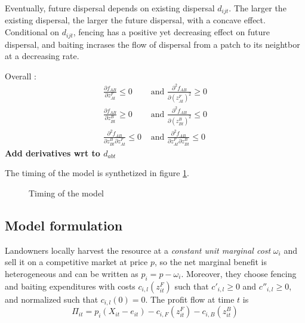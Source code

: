 \documentclass{article}
\begin{document}
Eventually, future dispersal depends on existing dispersal $d_{ijt}$. The larger the existing dispersal, the larger the future dispersal, with a concave effect. Conditional on $d_{ijt}$, fencing has a positive yet decreasing effect on future dispersal, and baiting incrases the flow of dispersal from a patch to its neightbor at a decreasing rate. 


 Overall : 
\begin{align*}
    \frac{\partial f_{AB}}{\partial z^F_{At}}\leq 0 &\text{ and } \frac{\partial^2 f_{AB}}{\partial (z^F_{At})^2} \geq 0\\
    \frac{\partial f_{AB}}{\partial z^B_{Bt}}\geq 0 &\text{ and } \frac{\partial^2 f_{AB}}{\partial (z^B_{Bt})^2} \leq 0\\
    \frac{\partial ^2 f_{AB}}{\partial z_{Bt}^B\partial z_{At}^F} \leq 0 &\text{ and } \frac{\partial ^2 f_{AB}}{\partial z_{At}^F\partial z_{Bt}^B} \leq 0
\end{align*}
\textbf{Add derivatives wrt to $d_{abt}$}


The timing of the model is synthetized in figure \ref{fig:timing}.

\begin{figure}[H]
  \centering
  \caption{Timing of the model}
  \label{fig:timing}
\end{figure}


\subsection{Model formulation}
Landowners locally harvest the resource at a \textit{constant unit marginal cost} $\omega_i$ and sell it on a competitive market at price $p$, so the net marginal benefit is heterogeneous and can be written as $p_i = p - \omega_i$. Moreover, they choose fencing and baiting expenditures with costs $c_{i,l}(z_{it}^F)$ such that $c'_{i,l}\geq 0$ and $c''_{i,l} \geq 0$, and normalized such that $c_{i,l}(0) = 0$. The profit flow at time $t$ is
\begin{equation}
    \Pi_{it} = p_i(X_{it} - e_{it}) - c_{i,F}(z_{it}^F) - c_{i,B}(z_{it}^B)
\end{equation}
\end{document}
